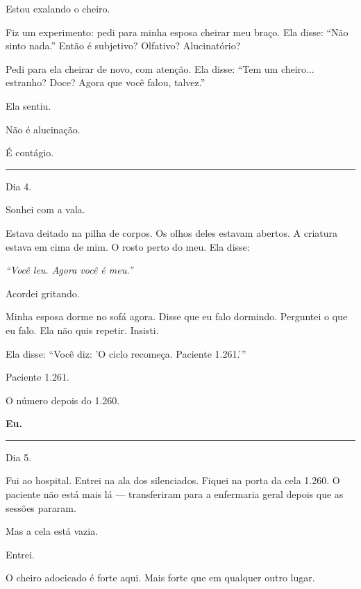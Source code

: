 \noindent Estou exalando o cheiro.

\noindent Fiz um experimento: pedi para minha esposa cheirar meu braço. Ela disse: \textquotedblleft{}Não sinto nada.\textquotedblright{} Então é subjetivo? Olfativo? Alucinatório?

\noindent Pedi para ela cheirar de novo, com atenção. Ela disse: \textquotedblleft{}Tem um cheiro... estranho? Doce? Agora que você falou, talvez.\textquotedblright{}

\noindent Ela sentiu.

\noindent Não é alucinação.

\noindent É contágio.

\vspace{0.5em}\noindent\rule{\textwidth}{0.5pt}\vspace{0.5em}

\noindent Dia 4.

\noindent Sonhei com a vala.

\noindent Estava deitado na pilha de corpos. Os olhos deles estavam abertos. A criatura estava em cima de mim. O rosto perto do meu. Ela disse:

\noindent \textit{\textquotedblleft{}Você leu. Agora você é meu.\textquotedblright{}}

\noindent Acordei gritando.

\noindent Minha esposa dorme no sofá agora. Disse que eu falo dormindo. Perguntei o que eu falo. Ela não quis repetir. Insisti.

\noindent Ela disse: \textquotedblleft{}Você diz: 'O ciclo recomeça. Paciente 1.261.'\textquotedblright{}

\noindent Paciente 1.261.

\noindent O número depois do 1.260.

\noindent \textbf{Eu.}

\vspace{0.5em}\noindent\rule{\textwidth}{0.5pt}\vspace{0.5em}

\noindent Dia 5.

\noindent Fui ao hospital. Entrei na ala dos silenciados. Fiquei na porta da cela 1.260. O paciente não está mais lá --- transferiram para a enfermaria geral depois que as sessões pararam.

\noindent Mas a cela está vazia.

\noindent Entrei.

\noindent O cheiro adocicado é forte aqui. Mais forte que em qualquer outro lugar.


